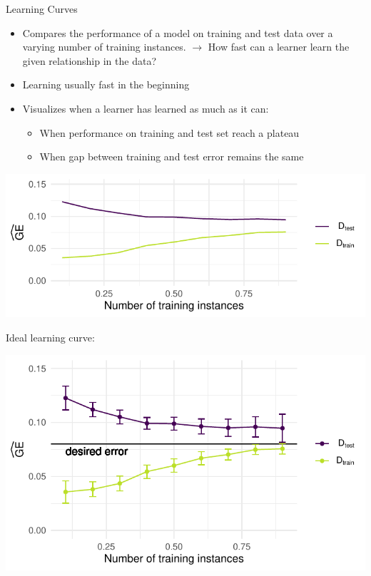     \begin{frame}[c,allowframebreaks]{Learning Curves}

    \begin{itemize}
    \item Compares the performance of a model on training and test data over a varying number of training instances.
    $\rightarrow$ How fast can a learner learn the given relationship in the data?
    \item Learning usually fast in the beginning
    \item Visualizes when a learner has learned as much as it can:
    \begin{itemize}
    \item When performance on training and test set reach a plateau
    \item When gap between training and test error remains the same
    \end{itemize}
    \end{itemize}

    \begin{center}
    \includegraphics[height=.4\textheight]{learning-curve}
    \end{center}

    \framebreak

    Ideal learning curve:

    \begin{center}
    \includegraphics[height=.7\textheight]{learning-curve-ideal}
    \end{center}


\end{frame}
